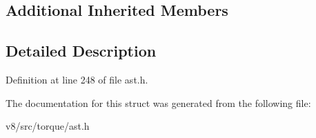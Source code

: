 \subsection*{Additional Inherited Members}


\subsection{Detailed Description}


Definition at line 248 of file ast.\+h.



The documentation for this struct was generated from the following file\+:\begin{DoxyCompactItemize}
\item 
v8/src/torque/ast.\+h\end{DoxyCompactItemize}
